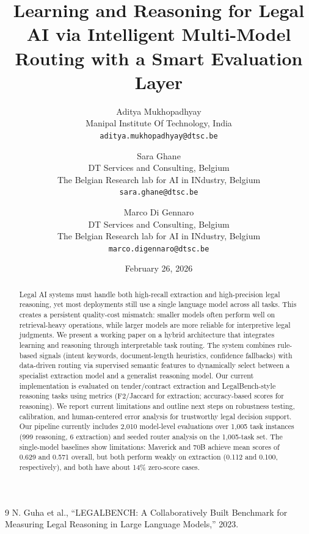 \documentclass[11pt,a4paper]{article}
\title{Learning and Reasoning for Legal AI via Intelligent Multi-Model Routing with a Smart Evaluation Layer}
\author{
Aditya Mukhopadhyay\\
\small Manipal Institute Of Technology, India\\
\small \texttt{aditya.mukhopadhyay@dtsc.be}
\and
Sara Ghane\\
\small DT Services and Consulting, Belgium\\
\small The Belgian Research lab for AI in INdustry, Belgium\\
\small \texttt{sara.ghane@dtsc.be}
\and
Marco Di Gennaro\\
\small DT Services and Consulting, Belgium\\
\small The Belgian Research lab for AI in INdustry, Belgium\\
\small \texttt{marco.digennaro@dtsc.be}
}
\date{February 26, 2026}
\begin{document}
\maketitle

\begin{abstract}
Legal AI systems must handle both high-recall extraction and high-precision legal reasoning, yet most deployments still use a single language model across all tasks. This creates a persistent quality-cost mismatch: smaller models often perform well on retrieval-heavy operations, while larger models are more reliable for interpretive legal judgments. We present a working paper on a hybrid architecture that integrates learning and reasoning through interpretable task routing. The system combines rule-based signals (intent keywords, document-length heuristics, confidence fallbacks) with data-driven routing via supervised semantic features to dynamically select between a specialist extraction model and a generalist reasoning model. Our current implementation is evaluated on tender/contract extraction and LegalBench-style reasoning tasks using metrics (F2/Jaccard for extraction; accuracy-based scores for reasoning). We report current limitations and outline next steps on robustness testing, calibration, and human-centered error analysis for trustworthy legal decision support. Our pipeline currently includes 2,010 model-level evaluations over 1,005 task instances (999 reasoning, 6 extraction) and seeded router analysis on the 1,005-task set. The single-model baselines show limitations: Maverick and 70B achieve mean scores of 0.629 and 0.571 overall, but both perform weakly on extraction (0.112 and 0.100, respectively), and both have about 14\% zero-score cases.
\end{abstract}


\begin{thebibliography}{9}
N. Guha et al., ``LEGALBENCH: A Collaboratively Built Benchmark for Measuring Legal Reasoning in Large Language Models,'' 2023.
\end{thebibliography}
\end{document}
